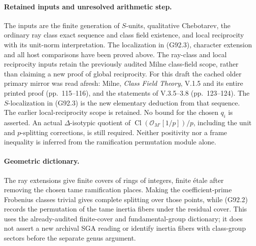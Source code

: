 \paragraph{Retained inputs and unresolved arithmetic step.}
The inputs are the finite generation of \(S\)-units, qualitative
Chebotarev, the ordinary ray class exact sequence and class field
existence, and local reciprocity with its unit-norm interpretation.
The localization in (G92.3), character extension and all host
comparisons have been proved above.  The ray-class and local
reciprocity inputs retain the previously audited Milne class-field
scope, rather than claiming a new proof of global reciprocity.
For this draft the cached older primary mirror was read afresh:
Milne, \emph{Class Field Theory}, V.1.5 and its entire printed proof
(pp.~115--116), and the statements of V.3.5--3.8 (pp.~123--124).
The \(S\)-localization in (G92.3) is the new elementary deduction
from that sequence.  The earlier local-reciprocity scope is retained.
No bound for the chosen \(q_i\) is asserted.
An actual \(\Delta\)-isotypic quotient of
\(\operatorname{Cl}(\mathcal O_{M'}[1/p])/p\), including the
unit and \(p\)-splitting corrections, is still required.
Neither positivity nor a frame inequality is inferred from the
ramification permutation module alone.

\paragraph{Geometric dictionary.}
The ray extensions give finite covers of rings of integers, finite
\'{e}tale after removing the chosen tame ramification places.
Making the coefficient-prime Frobenius classes trivial gives complete
splitting over those points, while (G92.2) records the permutation of
the tame inertia fibers under the residual cover.  This uses the
already-audited finite-cover and fundamental-group dictionary; it
does not assert a new archival SGA reading or identify inertia fibers
with class-group sectors before the separate genus argument.
